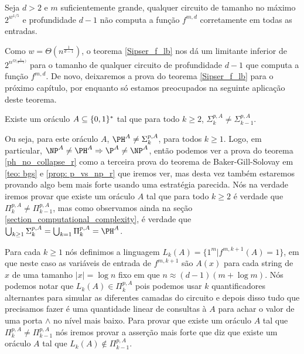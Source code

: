\begin{teo} \label{Sipser_f_lb}

Seja $d > 2$ e $m$ suficientemente grande, qualquer circuito de tamanho no máximo $2^{w^{1/5}}$ e profundidade $d - 1$ não computa a função $f^{m, d}$ corretamente em todas as entradas.

\end{teo}

Como $w = \Theta(n^{\frac{1}{d - 1}})$, o teorema \ref{Sipser_f_lb} nos dá um limitante inferior de $2^{n^{\Omega \big(\frac{1}{d - 1} \big)}}$ para o tamanho de qualquer circuito de profundidade $d - 1$ que computa a função $f^{m, d}$. De novo, deixaremos a prova do teorema \ref{Sipser_f_lb} para o próximo capítulo, por enquanto só estamos preocupados na seguinte aplicação deste teorema.

\begin{teo} \label{ph_no_collapse_r}
Existe um oráculo $A \subseteq \{0, 1\}^{*}$ tal que para todo $k \geq 2$, $\Sigma_{k}^{p, A} \neq \Sigma_{k - 1}^{p, A}$.
\end{teo}

Ou seja, para este oráculo $A$, $\PH^{A} \neq \Sigma_{k}^{p, A}$, para todos $k \geq 1$. Logo, em particular, $\NP^{A} \neq \PH^{A} \Rightarrow \P^{A} \neq \NP^{A}$, então podemos ver a prova do teorema \ref{ph_no_collapse_r} como a terceira prova do teorema de Baker-Gill-Solovay em \ref{teo: bgs} e \ref{prop: p_vs_np_r} que iremos ver, mas desta vez também estaremos provando algo bem mais forte usando uma estratégia parecida. Nós na verdade iremos provar que existe um oráculo $A$ tal que para todo $k \geq 2$ é verdade que $\Pi_{k}^{p, A} \neq \Pi_{k - 1}^{p, A}$, mas como observamos ainda na seção \ref{section_computational_complexity}, é verdade que $\bigcup_{k \geq 1} \Sigma_{k}^{p, A} = \bigcup_{k = 1} \Pi_{k}^{p, A} = \PH^{A}$. 

Para cada $k \geq 1$ nós definimos a linguagem $L_{k}(A) = \{1^{m} \lvert f^{m, k + 1}(A) = 1\}$, em que neste caso as variáveis de entrada de $f^{m, k + 1}$ são $A(x)$ para cada string de $x$ de uma tamanho $\lvert x \rvert = \log n$ fixo em que $n \approx (d - 1)(m + \log m)$. Nós podemos notar que $L_{k}(A) \in \Pi_{k}^{p, A}$ pois podemos usar $k$ quantificadores alternantes para simular as diferentes camadas do circuito e depois disso tudo que precisamos fazer é  uma quantidade linear de consultas à $A$ para achar o valor de uma porta $\land$ no nível mais baixo. Para provar que existe um oráculo $A$ tal que $\Pi_{k}^{p, A} \neq \Pi_{k - 1}^{p, A}$ nós iremos provar a asserção mais forte que diz que existe um oráculo $A$ tal que $L_{k}(A) \not\in \Pi_{k - 1}^{p, A}$.

